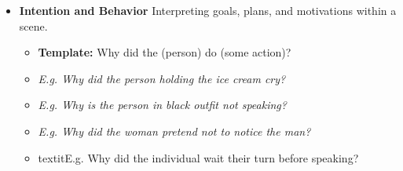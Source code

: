 \begin{tcolorbox}[colframe=black, colback=white, arc=3mm, boxrule=1pt, width=\linewidth, title=\textbf{Annotation Instructions}, breakable]
\begin{itemize}
    \item \textbf{Intention and Behavior} Interpreting goals, plans, and motivations within a scene. 
    \begin{itemize}
        \item \textbf{Template:} Why did the (person) do (some action)?
        \item \textit{E.g. Why did the person holding the ice cream cry?}
        \item \textit{E.g. Why is the person in black outfit not speaking?}
        \item \textit{E.g. Why did the woman pretend not to notice the man?}
        \item textit{E.g. Why did the individual wait their turn before speaking?}
    \end{itemize}
\end{itemize}


\end{tcolorbox}
